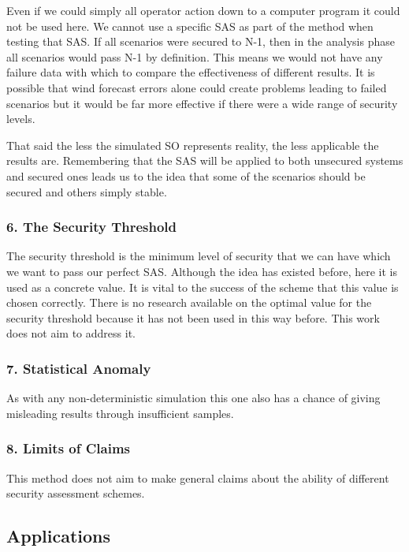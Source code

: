 \documentclass[a4paper,oneside,12pt]{report}
\begin{document}
Even if we could simply all operator action down to a computer program it could not be used here. We cannot use a specific SAS as part of the method when testing that SAS. If all scenarios were secured to N-1, then in the analysis phase all scenarios would pass N-1 by definition. This means we would not have any failure data with which to compare the effectiveness of different results. It is possible that wind forecast errors alone could create problems leading to failed scenarios but it would be far more effective if there were a wide range of security levels.

That said the less the simulated SO represents reality, the less applicable the results are. Remembering that the SAS will be applied to both unsecured systems and secured ones leads us to the idea that some of the scenarios should be secured and others simply stable.

\subsubsection{6. The Security Threshold}

The security threshold is the minimum level of security that we can have which we want to pass our perfect SAS. Although the idea has existed before, here it is used as a concrete value. It is vital to the success of the scheme that this value is chosen correctly. There is no research available on the optimal value for the security threshold because it has not been used in this way before. This work does not aim to address it.

\subsubsection{7. Statistical Anomaly}

As with any non-deterministic simulation this one also has a chance of giving misleading results through insufficient samples.

\subsubsection{8. Limits of Claims}

This method does not aim to make general claims about the ability of different security assessment schemes.

\subsection{Applications}
\end{document}
